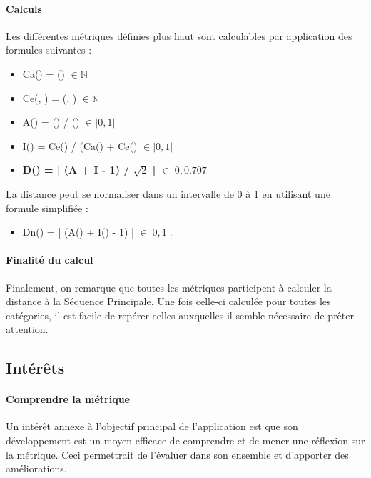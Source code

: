 \documentclass{scrartcl}
\begin{document}
    \paragraph{Calculs}Les différentes métriques définies plus haut sont calculables par application des formules suivantes : 
    \begin{itemize}
        \item Ca(\category{}) = \dependantClasses{}(\category{}) $\in \mathbb{N}$
        
        \item Ce(\category{}, \categoryUniverse{}) = \dependedClasses{}(\category{}, \categoryUniverse{}) $\in \mathbb{N}$
        
        \item A(\category{}) = 
        \numberOfabstractMethod{}(\category{}) /
        {\numberOfMethod{}(\category{})} $\in \lvert 0, 1\rvert$

        \item I(\category{}) = Ce(\category{}) / (Ca(\category{}) + Ce(\category{}) $\in \lvert 0, 1\rvert$
        
        \item \textbf{D(\category{}) = | (A + I - 1) / $\sqrt{2}$ | $\in \lvert 0, 0.707\rvert$}

    \end{itemize}
    
La distance peut se normaliser dans un intervalle de 0 à 1 en utilisant une formule simplifiée :
    \begin{itemize}
        \item Dn(\category{}) = | (A(\category{}) + I(\category{}) - 1) | $\in \lvert 0, 1\rvert$.
    \end{itemize}  

\paragraph{Finalité du calcul} Finalement, on remarque que toutes les métriques participent à calculer la distance à la Séquence Principale. Une fois celle-ci calculée pour toutes les catégories, il est facile de repérer celles auxquelles il semble nécessaire de prêter attention.

\subsection{Intérêts}
    
    \paragraph{Comprendre la métrique}Un intérêt annexe à l'objectif principal de l'application est que son développement est un moyen efficace de comprendre et de mener une réflexion sur la métrique. Ceci permettrait de l'évaluer dans son ensemble et d'apporter des améliorations.
    
\end{document}
